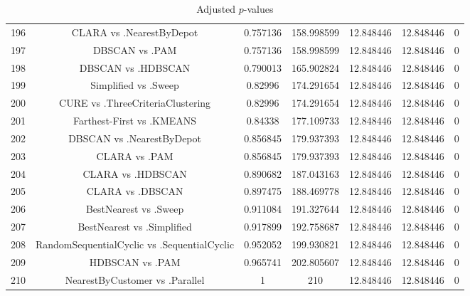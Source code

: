 \documentclass[a4paper,10pt]{article}
\begin{document}
\begin{landscape}
\begin{table}[!htp]
\begin{tabular}{ccccccc}
196&CLARA vs .NearestByDepot&0.757136&158.998599&12.848446&12.848446&0\\
197&DBSCAN vs .PAM&0.757136&158.998599&12.848446&12.848446&0\\
198&DBSCAN vs .HDBSCAN&0.790013&165.902824&12.848446&12.848446&0\\
199&Simplified vs .Sweep&0.82996&174.291654&12.848446&12.848446&0\\
200&CURE vs .ThreeCriteriaClustering&0.82996&174.291654&12.848446&12.848446&0\\
201&Farthest-First vs .KMEANS&0.84338&177.109733&12.848446&12.848446&0\\
202&DBSCAN vs .NearestByDepot&0.856845&179.937393&12.848446&12.848446&0\\
203&CLARA vs .PAM&0.856845&179.937393&12.848446&12.848446&0\\
204&CLARA vs .HDBSCAN&0.890682&187.043163&12.848446&12.848446&0\\
205&CLARA vs .DBSCAN&0.897475&188.469778&12.848446&12.848446&0\\
206&BestNearest vs .Sweep&0.911084&191.327644&12.848446&12.848446&0\\
207&BestNearest vs .Simplified&0.917899&192.758687&12.848446&12.848446&0\\
208&RandomSequentialCyclic vs .SequentialCyclic&0.952052&199.930821&12.848446&12.848446&0\\
209&HDBSCAN vs .PAM&0.965741&202.805607&12.848446&12.848446&0\\
210&NearestByCustomer vs .Parallel&1&210&12.848446&12.848446&0\\
\hline
\end{tabular}
\caption{Adjusted $p$-values}
\end{table}

\end{landscape}
\end{document}
